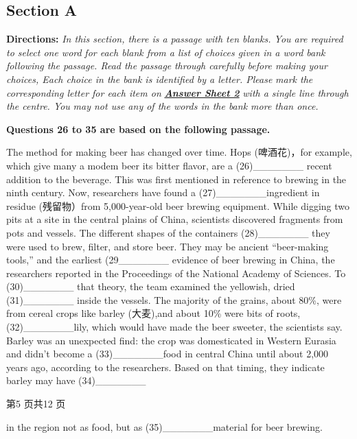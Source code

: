 \documentclass[UTF8,11pt]{ctexart}
\begin{document}
\subsection*{\textbf{Section A}}


\textbf{Directions:}\textit{ In this section, there is a passage with ten blanks. You are required to select one word} \textit{for each blank from a list of choices given in a word bank following the passage. Read the passage} \textit{through carefully before making your choices, Each choice in the bank is identified by a letter. Please} \textit{mark the corresponding letter for each item on}\textbf{\textit{ }}\textbf{\textit{\uline{Answer Sheet 2}}}\textit{ with a single line through the centre. You} \textit{may not use any of the words in the bank more than once.}


\textbf{Questions 26 to 35 are based on the following passage.}


The method for making beer has changed over time. Hops (啤酒花)，for example, which give many a modem beer its bitter flavor, are a (26)\_\_\_\_\_\_\_ recent addition to the beverage. This was first mentioned in reference to brewing in the ninth century. Now, researchers have found a (27)\_\_\_\_\_\_\_ingredient in residue (残留物）from 5,000-year-old beer brewing equipment. While digging two pits at a site in the central plains of China, scientists discovered fragments from pots and vessels. The different shapes of the containers (28)\_\_\_\_\_\_\_ they were used to brew, filter, and store beer. They may be ancient “beer-making tools,” and the earliest (29\_\_\_\_\_\_\_ evidence of beer brewing in China, the researchers reported in the Proceedings of the National Academy of Sciences. To (30)\_\_\_\_\_\_\_ that theory, the team examined the yellowish, dried (31)\_\_\_\_\_\_\_ inside the vessels. The majority of the grains, about 80\%, were from cereal crops like barley (大麦),and about 10\% were bits of roots, (32)\_\_\_\_\_\_\_lily, which would have made the beer sweeter, the scientists say. Barley was an unexpected find: the crop was domesticated in Western Eurasia and didn't become a (33)\_\_\_\_\_\_\_food in central China until about 2,000 years ago, according to the researchers. Based on that timing, they indicate barley may have (34)\_\_\_\_\_\_\_


第5 页共12 页


in the region not as food, but as (35)\_\_\_\_\_\_\_material for beer brewing.
\end{document}
